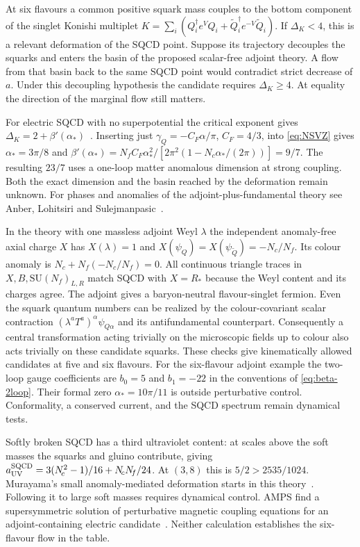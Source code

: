 \documentclass[11pt,a4paper]{article}
\theoremstyle{plain}
\theoremstyle{definition}
\theoremstyle{remark}
\newcommand{\Nc}{N_{\!c}}
\newcommand{\Nf}{N_{\!f}}
\newcommand{\SU}[1]{\mathrm{SU}(#1)}
\begin{document}
At six flavours a common positive squark mass couples to the bottom
component of the singlet Konishi multiplet
$K=\sum_i(Q_i^\dagger e^V Q_i+\widetilde Q_i^\dagger e^{-V}\widetilde Q_i)$.
If $\Delta_K<4$, this is a relevant deformation of the SQCD point.
Suppose its trajectory decouples the squarks and enters the basin of
the proposed scalar-free adjoint theory. A flow from that basin back
to the same SQCD point would contradict strict decrease of $a$.
Under this decoupling hypothesis the candidate requires $\Delta_K\ge4$.
At equality the direction of the marginal flow still matters.

For electric SQCD with no superpotential the critical exponent gives
$\Delta_K=2+\beta'(\alpha_*)$~\cite[Eq.~(1.1)]{KonishiSlope}.
Inserting just $\gamma_Q=-C_F\alpha/\pi$, $C_F=4/3$, into
\cref{eq:NSVZ} gives $\alpha_*=3\pi/8$ and
$\beta'(\alpha_*)=\Nf C_F\alpha_*^2/[2\pi^2(1-\Nc\alpha_*/(2\pi))]=9/7$.
The resulting $23/7$ uses a one-loop matter anomalous dimension at
strong coupling. Both the exact dimension and the basin reached by
the deformation remain unknown.
For phases and anomalies of the adjoint-plus-fundamental theory see
Anber, Lohitsiri and Sulejmanpasic~\cite{Anber2023}.

In the theory with one massless adjoint Weyl $\lambda$ the independent
anomaly-free axial charge $X$ has $X(\lambda)=1$ and
$X(\psi_Q)=X(\psi_{\widetilde Q})=-\Nc/\Nf$. Its colour anomaly
is $\Nc+\Nf(-\Nc/\Nf)=0$. All continuous triangle traces in
$X,B,\SU{\Nf}_{L,R}$ match SQCD with $X=R_*$ because the Weyl
content and its charges agree. The adjoint gives a baryon-neutral
flavour-singlet fermion. Even the squark quantum numbers can be
realized by the colour-covariant scalar contraction
$(\lambda^a T^a)^\alpha\psi_{Q\alpha}$ and its antifundamental
counterpart. Consequently a central transformation acting trivially
on the microscopic fields up to colour also acts trivially on these
candidate squarks. These checks give kinematically allowed candidates
at five and six flavours. For the six-flavour adjoint example the
two-loop gauge coefficients are $b_0=5$ and $b_1=-22$ in the
conventions of \cref{eq:beta-2loop}. Their formal zero
$\alpha_*=10\pi/11$ is outside perturbative control. Conformality,
a conserved current, and the SQCD spectrum remain dynamical tests.

Softly broken SQCD has a third ultraviolet content: at scales above
the soft masses the squarks and gluino contribute, giving
$a_{\rm UV}^{\rm SQCD}=3(\Nc^2-1)/16+\Nc\Nf/24$.
At $(3,8)$ this is $5/2>2535/1024$. Murayama's small anomaly-mediated
deformation starts in this theory~\cite{Murayama2021}. Following it
to large soft masses requires dynamical control. AMPS find a
supersymmetric solution of perturbative magnetic coupling equations
for an adjoint-containing electric candidate~\cite{AMPS2013}.
Neither calculation establishes the six-flavour flow in the table.
\end{document}
